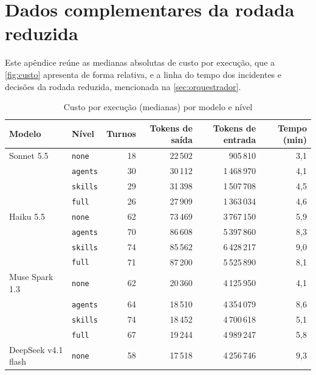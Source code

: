 
\section{Dados complementares da rodada reduzida}
\label{apd:complementares}

Este apêndice reúne as medianas absolutas de custo por execução, que a
\autoref{fig:custo} apresenta de forma relativa, e a linha do tempo dos
incidentes e decisões da rodada reduzida, mencionada na
\autoref{sec:orquestrador}.

\begin{table}[!htb]
    \centering
    \ABNTEXfontereduzida
    \caption{Custo por execução (medianas) por modelo e nível}
    \label{tab:custo}
    \begin{tabular}{llrrrr}
        \toprule
        \textbf{Modelo} & \textbf{Nível} & \textbf{Turnos} & \textbf{Tokens de saída} & \textbf{Tokens de entrada} & \textbf{Tempo (min)} \\
        \midrule
        Sonnet 5.5 & \texttt{none} & 18 & 22\,502 & 905\,810 & 3,1 \\
         & \texttt{agents} & 30 & 30\,112 & 1\,468\,970 & 4,1 \\
         & \texttt{skills} & 29 & 31\,398 & 1\,507\,708 & 4,5 \\
         & \texttt{full} & 26 & 27\,909 & 1\,363\,034 & 4,6 \\
        \midrule
        Haiku 5.5 & \texttt{none} & 62 & 73\,469 & 3\,767\,150 & 5,9 \\
         & \texttt{agents} & 70 & 86\,608 & 5\,397\,860 & 8,3 \\
         & \texttt{skills} & 74 & 85\,562 & 6\,428\,217 & 9,0 \\
         & \texttt{full} & 71 & 87\,200 & 5\,525\,890 & 8,1 \\
        \midrule
        Muse Spark 1.3 & \texttt{none} & 62 & 20\,360 & 4\,125\,950 & 4,1 \\
         & \texttt{agents} & 64 & 18\,510 & 4\,354\,079 & 8,6 \\
         & \texttt{skills} & 74 & 18\,452 & 4\,700\,618 & 5,1 \\
         & \texttt{full} & 67 & 19\,244 & 4\,989\,247 & 5,8 \\
        \midrule
        DeepSeek v4.1 flash & \texttt{none} & 58 & 17\,518 & 4\,256\,746 & 9,3 \\

\end{tabular}
\end{table}
